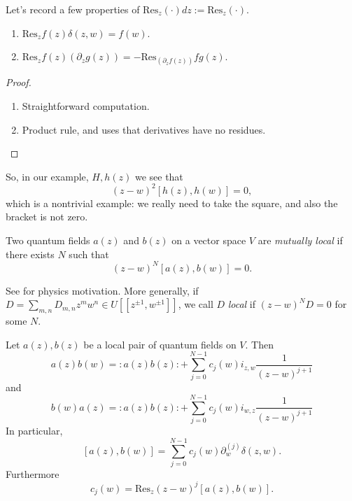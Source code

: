 Let's record a few properties of
$\text{Res}_z(\cdot)dz:=\text{Res}_z(\cdot)$.

\begin{lemma}
\label{lemma-properties-of-residues}
\begin{enumerate}
\item $\text{Res}_zf(z)\delta(z,w)=f(w)$.
\item
$\text{Res}_zf(z)(\partial_zg(z))=-\text{Res}
_(\partial_zf(z))fg(z)$.
\end{enumerate}
\end{lemma}

\begin{proof}
\begin{enumerate}
\item Straightforward computation.
\item Product rule, and uses that derivatives
have no residues.
\end{enumerate}
\end{proof}

So, in our example, $H,h(z)$ we see that
$$
(z-w)^2[h(z),h(w)]=0,
$$
which is a nontrivial example: we really need
to
take the square, and also the bracket is not
zero.

\medskip\noindent
\begin{definition}
\label{definition-mutua-local-quant-field}
Two quantum fields $a(z)$ and $b(z)$ on a
vector space
$V$ are {\it mutually local} if there exists
$N$
such that
$$
(z-w)^N[a(z),b(w)]=0.
$$
\end{definition}

\begin{remark}
\label{remark-motivation}
See  \cite[Chapter 1]{KVA} for physics
motivation.
More generally, if $D=\sum_{m,n}D_{m,n}z^mw^n
\in U[\![z^{\pm 1}, w^{\pm
1}]\!]$,
we call $D$ {\it local} if $(z-w)^ND=0$ for
some $N$.
\end{remark}

\begin{proposition}
\label{proposition-}
Let $a(z),b(z)$ be a local pair of quantum
fields on $V$.
Then
\begin{equation}
\label{equation-1}
a(z)b(w)=
:\!a(z)b(z)\!:+\sum_{j=0}^{N-1}c_j(w)
i_{z,w}\frac{1}{(z-w)^{j+1}}
\end{equation}
and
\begin{equation}
\label{equation-2}
b(w)a(z)=:\!a(z)b(z)\!:+\sum_{j=0}^{N-1}
c_j(w)
i_{w,z}\frac{1}{(z-w)^{j+1}}
\end{equation}
In particular,
\begin{equation}
\label{equation-3}
[a(z),b(w)]=\sum_{j=0}^{N-1}c_j(w)
\partial_w^{(j)}\delta(z,w).
\end{equation}
Furthermore
\begin{equation}
\label{equation-4}
c_j(w)=\text{Res}_z(z-w)^j[a(z),b(w)].
\end{equation}
\end{proposition}

